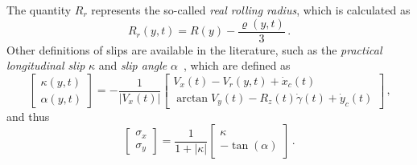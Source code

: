 %
The quantity $R_r$ represents the so-called \emph{real rolling radius}, which is calculated as
%
\begin{equation*}
  R_r(y,t) = R(y) - \dfrac{\varrho(y,t)}{3} \, \text{.}
\end{equation*}
%
Other definitions of slips are available in the literature, such as the \emph{practical longitudinal slip} $\kappa$ and \emph{slip angle} $\alpha$~\cite{pacejka2012tire}, which are defined as
%
\begin{equation*}
  \begin{bmatrix}
    \kappa(y,t) \\[0.2em]
    \alpha(y,t)
  \end{bmatrix}
  =
  -\dfrac{1}{|V_x(t)|}
  \begin{bmatrix}
    V_x(t) - V_r(y,t) + \dot{x}_c(t) \\[0.2em]
    \arctan{V_y(t) - R_z(t)\dot{\gamma}(t) + \dot{y}_c(t)}
  \end{bmatrix} \, \text{,}
\end{equation*}
%
and thus
%
\begin{equation*}
  \begin{bmatrix}
    \sigma_x \\[0.2em]
    \sigma_y
  \end{bmatrix}
  =
  \dfrac{1}{1 + |\kappa|}
  \begin{bmatrix}
    \kappa \\[0.2em]
    -\tan(\alpha)
  \end{bmatrix} \, \text{.}
\end{equation*}

